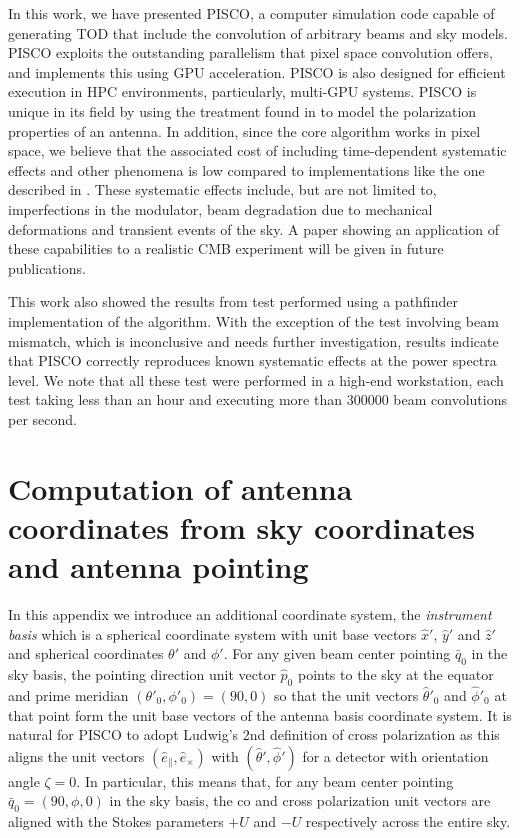 \documentclass[a4paper,11pt]{article}
\newcommand{\co}{\mathbin{\|}}
\newcommand{\cx}{\mathbin{\times}}
\begin{document}
In this work, we have presented PISCO, a computer simulation code capable of generating TOD that include the convolution of arbitrary beams and sky models. PISCO exploits the outstanding parallelism that pixel space convolution offers, and implements this using GPU acceleration. PISCO is also designed for efficient execution in HPC environments, particularly, multi-GPU systems. PISCO is unique in its field by using the treatment found in \cite{2007MNRAS.376.1767O} to model the polarization properties of an antenna. In addition, since the core algorithm works in pixel space, we believe that the associated cost of including time-dependent systematic effects and other phenomena is low compared to implementations like the one described in \cite{2018arXiv180905034D}. These systematic effects include, but are not limited to, imperfections in the modulator, beam degradation due to mechanical deformations and transient events of the sky. A paper showing an application of these capabilities to a realistic CMB experiment will be given in future publications.

This work also showed the results from test performed using a pathfinder implementation of the algorithm. With the exception of the test involving beam mismatch, which is inconclusive and needs further investigation, results indicate that PISCO correctly reproduces known systematic effects at the power spectra level. We note that all these test were performed in a high-end workstation, each test taking less than an hour and executing more than 300000 beam convolutions per second.




\appendix
\section{Computation of antenna coordinates from sky coordinates and antenna pointing}

In this appendix we introduce an additional coordinate system, the \textsl{instrument basis} which is a spherical coordinate system with unit base vectors $\hat{x}'$, $\hat{y}'$ and $\hat{z}'$ and spherical coordinates $\theta'$ and $\phi'$. For any given beam center pointing $\bar{q}_0$ in the sky basis, the pointing direction unit vector $\hat{p}_0$ points to the sky at the equator and prime meridian $(\theta'_0,\phi'_0) = (90,0)$ so that the unit vectors $\hat{\theta}'_0$ and $\hat{\phi}'_0$ at that point form the unit base vectors of the antenna basis coordinate system. It is natural for PISCO to adopt Ludwig's 2nd definition of cross polarization \cite{1140406} as this aligns the unit vectors $(\hat{e}_{\co},\hat{e}_{\cx})$ with $(\hat{\theta}',\hat{\phi}')$ for a detector with orientation angle $\zeta = 0$. In particular, this means that, for any beam center pointing $\bar{q}_0 = (90,\phi,0)$ in the sky basis, the co and cross polarization unit vectors are aligned with the Stokes parameters $+U$ and $-U$ respectively across the entire sky.
\end{document}
